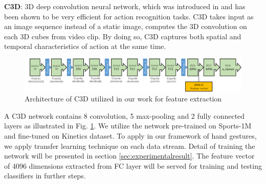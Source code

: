     \textbf{C3D}: 3D deep convolution neural network, which was introduced in \cite{tran2015learning} and has been shown to be very efficient for action recognition tasks. C3D takes input as an image sequence instead of a static image, computes the 3D convolution on each 3D cubes from video clip. By doing so, C3D captures both spatial and temporal characteristics of action at the same time.
    \begin{figure}[htbp]
        \centering
        \includegraphics[width=1\linewidth]{Figs/C3D.png}
        \caption{Architecture of C3D utilized in our work for feature extraction}
        \label{fig:C3D}
    \end{figure}
    A C3D network contains 8 convolution, 5 max-pooling and 2 fully connected layers as illustrated in Fig. \ref{fig:C3D}. 
    We utilize the network pre-trained on Sports-1M and fine-tuned on Kinetics dataset. To apply in our framework of hand gestures, we apply transfer learning technique on each data stream. Detail of training the network will be presented in section \ref{sec:experimentalresult}. The feature vector of 4096 dimensions extracted from FC layer will be served for training and testing classifiers in further steps.
